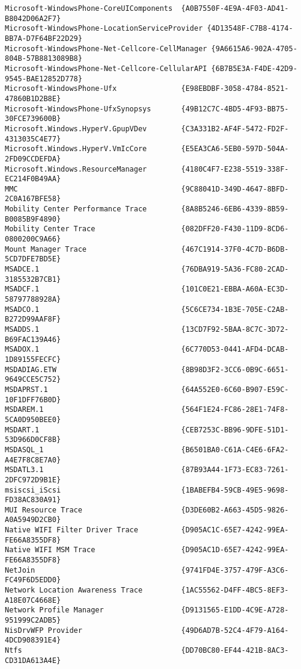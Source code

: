 \documentclass{report}
\begin{document}
\begin{lstlisting}[breaklines=true,basicstyle=\tiny]
Microsoft-WindowsPhone-CoreUIComponents  {A0B7550F-4E9A-4F03-AD41-B8042D06A2F7}
Microsoft-WindowsPhone-LocationServiceProvider {4D13548F-C7B8-4174-BB7A-D7F64BF22D29}
Microsoft-WindowsPhone-Net-Cellcore-CellManager {9A6615A6-902A-4705-804B-57B8813089B8}
Microsoft-WindowsPhone-Net-Cellcore-CellularAPI {6B7B5E3A-F4DE-42D9-9545-BAE12852D778}
Microsoft-WindowsPhone-Ufx               {E98EBDBF-3058-4784-8521-47860B1D2B8E}
Microsoft-WindowsPhone-UfxSynopsys       {49B12C7C-4BD5-4F93-BB75-30FCE739600B}
Microsoft.Windows.HyperV.GpupVDev        {C3A331B2-AF4F-5472-FD2F-4313035C4E77}
Microsoft.Windows.HyperV.VmIcCore        {E5EA3CA6-5EB0-597D-504A-2FD09CCDEFDA}
Microsoft.Windows.ResourceManager        {4180C4F7-E238-5519-338F-EC214F0B49AA}
MMC                                      {9C88041D-349D-4647-8BFD-2C0A167BFE58}
Mobility Center Performance Trace        {8A8B5246-6EB6-4339-8B59-B0085B9F4890}
Mobility Center Trace                    {082DFF20-F430-11D9-8CD6-0800200C9A66}
Mount Manager Trace                      {467C1914-37F0-4C7D-B6DB-5CD7DFE7BD5E}
MSADCE.1                                 {76DBA919-5A36-FC80-2CAD-3185532B7CB1}
MSADCF.1                                 {101C0E21-EBBA-A60A-EC3D-58797788928A}
MSADCO.1                                 {5C6CE734-1B3E-705E-C2AB-B272D99AAF8F}
MSADDS.1                                 {13CD7F92-5BAA-8C7C-3D72-B69FAC139A46}
MSADOX.1                                 {6C770D53-0441-AFD4-DCAB-1D89155FECFC}
MSDADIAG.ETW                             {8B98D3F2-3CC6-0B9C-6651-9649CCE5C752}
MSDAPRST.1                               {64A552E0-6C60-B907-E59C-10F1DFF76B0D}
MSDAREM.1                                {564F1E24-FC86-28E1-74F8-5CA0D950BEE0}
MSDART.1                                 {CEB7253C-BB96-9DFE-51D1-53D966D0CF8B}
MSDASQL_1                                {B6501BA0-C61A-C4E6-6FA2-A4E7F8C8E7A0}
MSDATL3.1                                {87B93A44-1F73-EC83-7261-2DFC972D9B1E}
msiscsi_iScsi                            {1BABEFB4-59CB-49E5-9698-FD38AC830A91}
MUI Resource Trace                       {D3DE60B2-A663-45D5-9826-A0A5949D2CB0}
Native WIFI Filter Driver Trace          {D905AC1C-65E7-4242-99EA-FE66A8355DF8}
Native WIFI MSM Trace                    {D905AC1D-65E7-4242-99EA-FE66A8355DF8}
NetJoin                                  {9741FD4E-3757-479F-A3C6-FC49F6D5EDD0}
Network Location Awareness Trace         {1AC55562-D4FF-4BC5-8EF3-A18E07C4668E}
Network Profile Manager                  {D9131565-E1DD-4C9E-A728-951999C2ADB5}
NisDrvWFP Provider                       {49D6AD7B-52C4-4F79-A164-4DCD908391E4}
Ntfs                                     {DD70BC80-EF44-421B-8AC3-CD31DA613A4E}

\end{lstlisting}
\end{document}
